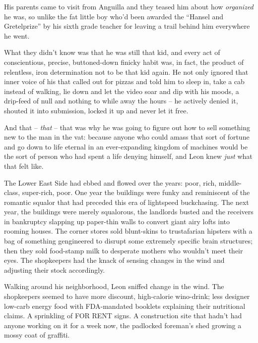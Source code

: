 His parents came to visit from Anguilla and they teased him about how 
\emph{organized} he was, so unlike the fat little boy who'd been 
awarded the “Hansel and Gretelprize” by his sixth grade teacher for 
leaving a trail behind him everywhere he went.

What they didn't know was that he was still that kid, and every act of 
conscientious, precise, buttoned-down finicky habit was, in fact, the 
product of relentless, iron determination not to be that kid again. He 
not only ignored that inner voice of his that called out for pizzas and 
told him to sleep in, take a cab instead of walking, lie down and let 
the video soar and dip with his moods, a drip-feed of null and nothing 
to while away the hours -- he actively denied it, shouted it into 
submission, locked it up and never let it free.

And that -- \emph{that} -- that was why he was going to figure out how 
to sell something new to the man in the vat: because anyone who could 
amass that sort of fortune and go down to life eternal in an 
ever-expanding kingdom of machines would be the sort of person who had 
spent a life denying himself, and Leon knew \emph{just} what that felt 
like.

\tb

The Lower East Side had ebbed and flowed over the years: poor, rich, 
middle-class, super-rich, poor. One year the buildings were funky and 
reminiscent of the romantic squalor that had preceded this era of 
lightspeed buckchasing. The next year, the buildings were merely 
squalorous, the landlords busted and the receivers in bankruptcy 
slapping up paper-thin walls to convert giant airy lofts into rooming 
houses. The corner stores sold blunt-skins to trustafarian hipsters 
with a bag of something gengineered to disrupt some extremely specific 
brain structures; then they sold food-stamp milk to desperate mothers 
who wouldn't meet their eyes. The shopkeepers had the knack of sensing 
changes in the wind and adjusting their stock accordingly.

Walking around his neighborhood, Leon sniffed change in the wind. The 
shopkeepers seemed to have more discount, high-calorie wino-drink; less 
designer low-carb energy food with FDA-mandated booklets explaining 
their nutritional claims. A sprinkling of FOR RENT signs. A 
construction site that hadn't had anyone working on it for a week now, 
the padlocked foreman's shed growing a mossy coat of graffiti.

